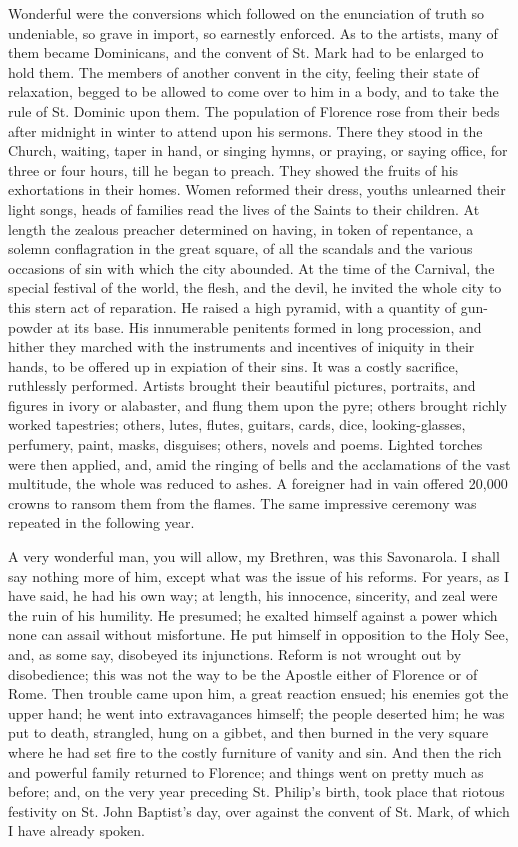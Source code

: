 Wonderful were the conversions which followed on the
enunciation of truth so undeniable, so grave in import,
so earnestly enforced. As to the artists, many of them
became Dominicans, and the convent of St. Mark had to be
enlarged to hold them. The members of another convent in
the city, feeling their state of relaxation, begged to be
allowed to come over to him in a body, and to take the
rule of St. Dominic upon them. The population of Florence
rose from their beds after midnight in winter to attend
upon his sermons. There they stood in the Church,
waiting, taper in hand, or singing hymns, or praying, or
saying office, for three or four hours, till he began to
preach. They showed the fruits of his exhortations in
their homes. Women reformed their dress, youths unlearned
their light songs, heads of families read the lives of
the Saints to their children. At length the zealous
preacher determined on having, in token of repentance, a
solemn conflagration in the great square, of all the
scandals and the various occasions of sin with which the
city abounded. At the time of the Carnival, the special
festival of the world, the flesh, and the devil, he
invited the whole city to this stern act of reparation.
He raised a high pyramid, with a quantity of gun-powder
at its base. His innumerable penitents formed in long
procession, and hither they marched with the instruments
and incentives of iniquity in their hands, to be offered
up in expiation of their sins. It was a costly sacrifice,
ruthlessly performed. Artists brought their beautiful
pictures, portraits, and figures in ivory or alabaster,
and flung them upon the pyre; others brought richly
worked tapestries; others, lutes, flutes, guitars, cards,
dice, looking-glasses, perfumery, paint, masks,
disguises; others, novels and poems. Lighted torches were
then applied, and, amid the ringing of bells and the
acclamations of the vast multitude, the whole was reduced
to ashes. A foreigner had in vain offered 20,000 crowns
to ransom them from the flames. The same impressive
ceremony was repeated in the following year.

A very wonderful man, you will allow, my Brethren, was
this Savonarola. I shall say nothing more of him, except
what was the issue of his reforms. For years, as I have
said, he had his own way; at length, his innocence,
sincerity, and zeal were the ruin of his humility. He
presumed; he exalted himself against a power which none
can assail without misfortune. He put himself in
opposition to the Holy See, and, as some say, disobeyed
its injunctions. Reform is not wrought out by
disobedience; this was not the way to be the Apostle
either of Florence or of Rome. Then trouble came upon
him, a great reaction ensued; his enemies got the upper
hand; he went into extravagances himself; the people
deserted him; he was put to death, strangled, hung on a
gibbet, and then burned in the very square where he had
set fire to the costly furniture of vanity and sin. And
then the rich and powerful family returned to Florence;
and things went on pretty much as before; and, on the
very year preceding St. Philip's birth, took place that
riotous festivity on St. John Baptist's day, over against
the convent of St. Mark, of which I have already spoken.

